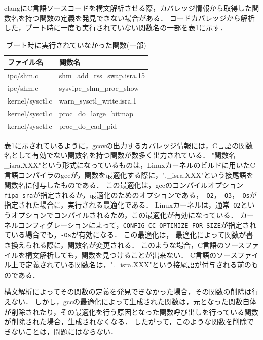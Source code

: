 \documentclass[graduation-thesis]{mlarticle}
\begin{document}
clangにC言語ソースコードを構文解析させる際，カバレッジ情報から取得した関数名を持つ関数の定義を発見できない場合がある．
コードカバレッジから解析した，ブート時に一度も実行されていない関数名の一部を表\ref{table:unusedfunctions}に示す．

\begin{table}[H]
\begin{center}
  \begin{tabular}{ll} \hline
    ファイル名 & 関数名 \\ \hline \hline
    ipc/shm.c & shm\_add\_rss\_swap.isra.15 \\
    ipc/shm.c & sysvipc\_shm\_proc\_show \\
    kernel/sysctl.c & warn\_sysctl\_write.isra.1 \\
    kernel/sysctl.c & proc\_do\_large\_bitmap \\
    kernel/sysctl.c & proc\_do\_cad\_pid \\ \hline
  \end{tabular}
  \caption{ブート時に実行されていなかった関数(一部)}
  \label{table:unusedfunctions}
\end{center}
\end{table}

表\ref{table:unusedfunctions}に示されているように，gcovの出力するカバレッジ情報には，C言語の関数名として有効でない関数名を持つ関数が数多く出力されている．
"関数名\_isra.XXX"という形式になっているものは，Linuxカーネルのビルドに用いたC言語コンパイラのgcc\cite{gcc}が，関数を最適化する際に，".\_isra.XXX"という接尾語を関数名に付与したものである．
この最適化は，gccのコンパイルオプション\texttt{-fipa-sra}が指定されるか，最適化のためのオプションである，\texttt{-O2}，\texttt{-O3}，\texttt{-Os}が指定された場合に，実行される最適化である．
Linuxカーネルは，通常\texttt{-O2}というオプションでコンパイルされるため，この最適化が有効になっている．
カーネルコンフィグレーションによって，\texttt{CONFIG\_CC\_OPTIMIZE\_FOR\_SIZE}が指定されている場合でも，\texttt{-Os}が有効になる．
この最適化は，
最適化によって関数が書き換えられる際に，関数名が変更される．
このような場合，C言語のソースファイルを構文解析しても，関数を見つけることが出来ない．
C言語のソースファイル上で定義されている関数名は，".\_isra.XXX"という接尾語が付与される前のものである．

構文解析によってその関数の定義を発見できなかった場合，その関数の削除は行えない．
しかし，gccの最適化によって生成された関数は，元となった関数自体が削除されたり，その最適化を行う原因となった関数呼び出しを行っている関数が削除された場合，生成されなくなる．
したがって，このような関数を削除できないことは，問題にはならない．
\end{document}
